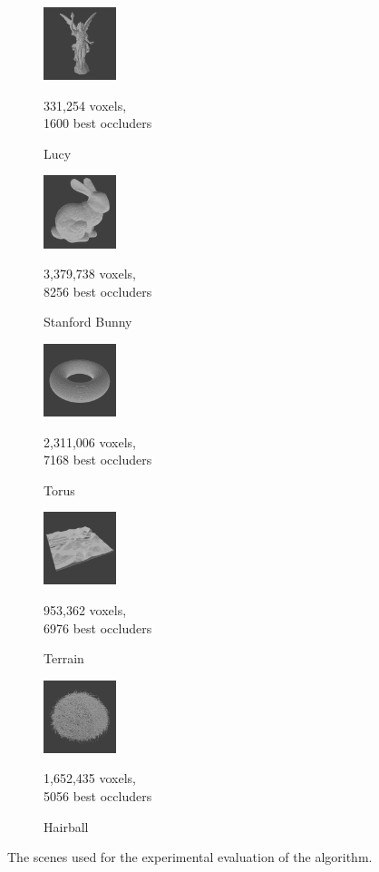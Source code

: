\begin{figure}[!htb]
  \begin{subfigure}{80px}
      \includegraphics[width=80px]{images/graphics/model-lucy.jpg}
      \caption{Lucy}
      \parbox{\linewidth}{\centering\footnotesize 331,254 voxels,\\ 1600 best occluders}
  \end{subfigure}
  \begin{subfigure}{80px}
      \includegraphics[width=80px]{images/graphics/model-bunny.jpg}
      \caption{Stanford Bunny}
      \parbox{\linewidth}{\centering\footnotesize 3,379,738 voxels,\\ 8256 best occluders}
  \end{subfigure}
  \begin{subfigure}{80px}
      \includegraphics[width=80px]{images/graphics/model-torus.jpg}
      \caption{Torus}
      \parbox{\linewidth}{\centering\footnotesize 2,311,006 voxels,\\ 7168 best occluders}
  \end{subfigure}
  \begin{subfigure}{80px}
      \includegraphics[width=80px]{images/graphics/model-terrain.jpg}
      \caption{Terrain}
      \parbox{\linewidth}{\centering\footnotesize 953,362 voxels,\\ 6976 best occluders}
  \end{subfigure}
  \begin{subfigure}{80px}
      \includegraphics[width=80px]{images/graphics/model-hairball.jpg}
      \caption{Hairball}
      \parbox{\linewidth}{\centering\footnotesize 1,652,435 voxels,\\ 5056 best occluders}
  \end{subfigure}
  
  \caption{The scenes used for the experimental evaluation of the algorithm.}
  \label{fig:experiment-models}
\end{figure}

